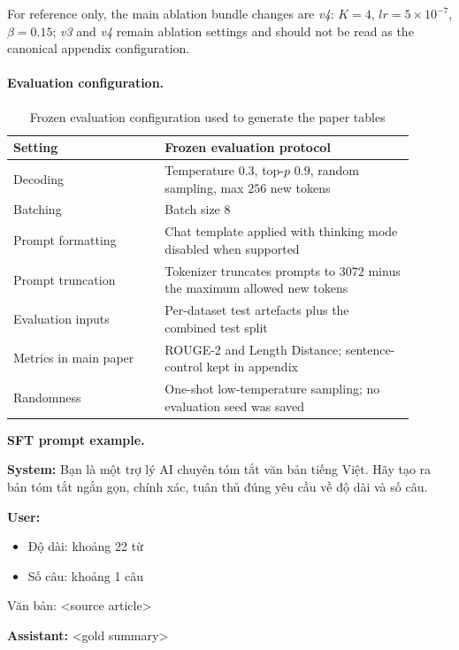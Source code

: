 \documentclass[11pt]{article}
\newcommand{\vn}[1]{{\vietfont #1}}
\newenvironment{vnblock}{\begingroup\vietfont}{\endgroup}
\begin{document}
For reference only, the main ablation bundle changes are \textit{v4}: $K=4$, $\mathit{lr} = 5\times10^{-7}$, $\beta = 0.15$; \textit{v3} and \textit{v4} remain ablation settings and should not be read as the canonical appendix configuration.

\paragraph{Evaluation configuration.}
\begin{table}[H]
\centering
\caption{Frozen evaluation configuration used to generate the paper tables}
\label{tab:appendix-eval-config}
\small
\begin{tabular}{L{0.34\linewidth}L{0.56\linewidth}}
\toprule
Setting & Frozen evaluation protocol \\
\midrule
Decoding & Temperature $0.3$, top-$p$ $0.9$, random sampling, max $256$ new tokens \\
Batching & Batch size $8$ \\
Prompt formatting & Chat template applied with thinking mode disabled when supported \\
Prompt truncation & Tokenizer truncates prompts to $3072$ minus the maximum allowed new tokens \\
Evaluation inputs & Per-dataset test artefacts plus the combined test split \\
Metrics in main paper & ROUGE-2 and Length Distance; sentence-control kept in appendix \\
Randomness & One-shot low-temperature sampling; no evaluation seed was saved \\
\bottomrule
\end{tabular}
\end{table}

\noindent\textbf{SFT prompt example.}\par\smallskip
\noindent\colorbox{promptbg}{%
\begin{minipage}{\dimexpr\textwidth-2\fboxsep\relax}
\small\vspace{4pt}
\textbf{System:} \vn{Bạn là một trợ lý AI chuyên tóm tắt văn bản tiếng Việt. Hãy tạo ra bản tóm tắt ngắn gọn, chính xác, tuân thủ đúng yêu cầu về độ dài và số câu.}

\smallskip
\textbf{User:}
\begin{vnblock}
\begin{itemize}
  \item Độ dài: khoảng 22 từ
  \item Số câu: khoảng 1 câu
\end{itemize}
\vn{Văn bản:} \textless{}source article\textgreater
\end{vnblock}

\smallskip
\textbf{Assistant:}
\textless{}gold summary\textgreater
\vspace{4pt}
\end{minipage}}
\end{document}
